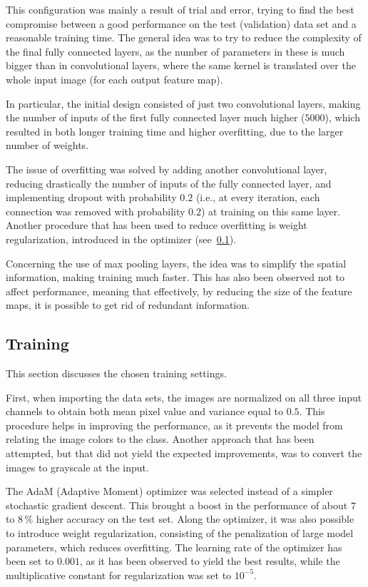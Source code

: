 \documentclass[12pt]{article}
\begin{document}
This configuration was mainly a result of trial and error, trying to find the best compromise between a good performance on the test (validation) data set and a reasonable training time.
The general idea was to try to reduce the complexity of the final fully connected layers, as the number of parameters in these is much bigger than in convolutional layers, where the same kernel is translated over the whole input image (for each output feature map).

In particular, the initial design consisted of just two convolutional layers, making the number of inputs of the first fully connected layer much higher ($5000$), which resulted in both longer training time and higher overfitting, due to the larger number of weights.

The issue of overfitting was solved by adding another convolutional layer, reducing drastically the number of inputs of the fully connected layer, and implementing dropout with probability $0.2$ (i.e., at every iteration, each connection was removed with probability $0.2$) at training on this same layer.
Another procedure that has been used to reduce overfitting is weight regularization, introduced in the optimizer (see\ \ref{sec:tr}).

Concerning the use of max pooling layers, the idea was to simplify the spatial information, making training much faster.
This has also been observed not to affect performance, meaning that effectively, by reducing the size of the feature maps, it is possible to get rid of redundant information.

\subsection{Training}\label{sec:tr}

This section discusses the chosen training settings.

First, when importing the data sets, the images are normalized on all three input channels to obtain both mean pixel value and variance equal to $0.5$.
This procedure helps in improving the performance, as it prevents the model from relating the image colors to the class.
Another approach that has been attempted, but that did not yield the expected improvements, was to convert the images to grayscale at the input.

The AdaM (Adaptive Moment) optimizer was selected instead of a simpler stochastic gradient descent.
This brought a boost in the performance of about $7$ to $8\, \%$ higher accuracy on the test set.
Along the optimizer, it was also possible to introduce weight regularization, consisting of the penalization of large model parameters, which reduces overfitting.
The learning rate of the optimizer has been set to $0.001$, as it has been observed to yield the best results, while the multiplicative constant for regularization was set to $10^{-5}$.
\end{document}
